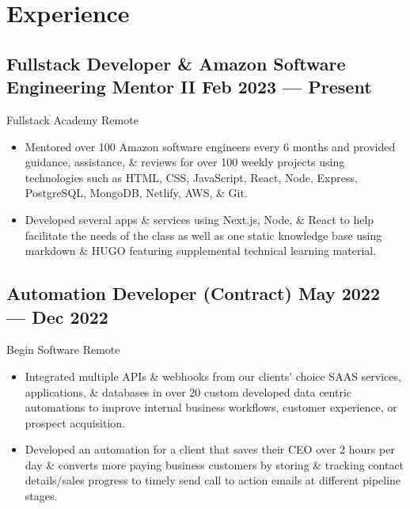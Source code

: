 \documentclass[a4,10pt]{article}
\newcommand{\subtext}[1]{
#1\par\vspace{-0.2cm}}
\newenvironment{zitemize}{
\begin{itemize}\itemsep0pt \parskip0pt \parsep1pt}
{\end{itemize}\vspace{-0.5cm}}
\begin{document}
\section{Experience}


\subsection*{Fullstack Developer \& Amazon Software Engineering Mentor II {\normalsize \normalfont} \hfill  Feb 2023 --- Present }
\subtext{Fullstack Academy \hfill Remote }
    \begin{zitemize}
        \item Mentored over 100 Amazon software engineers every 6 months and provided guidance, assistance, \& reviews for over 100 weekly projects using technologies such as HTML, CSS, JavaScript, React, Node, Express, PostgreSQL, MongoDB, Netlify, AWS, \& Git.
        \item Developed several apps \& services using Next.js, Node, \& React to help facilitate the needs of the class as well as one static knowledge base using markdown \& HUGO featuring supplemental technical learning material.
    \end{zitemize}


\subsection*{Automation Developer {\normalsize \normalfont(Contract) } \hfill  May 2022 --- Dec 2022 }
\subtext{Begin Software \hfill Remote }  
    \begin{zitemize}
        \item Integrated multiple APIs \& webhooks from our clients' choice SAAS services, applications, \& databases in over 20 custom developed data centric automations to improve internal business workflows, customer experience, or prospect acquisition.
        \item Developed an automation for a client that saves their CEO over 2 hours per day \& converts more paying business customers by storing \& tracking contact details/sales progress to timely send call to action emails at different pipeline stages.
    \end{zitemize}
\end{document}
